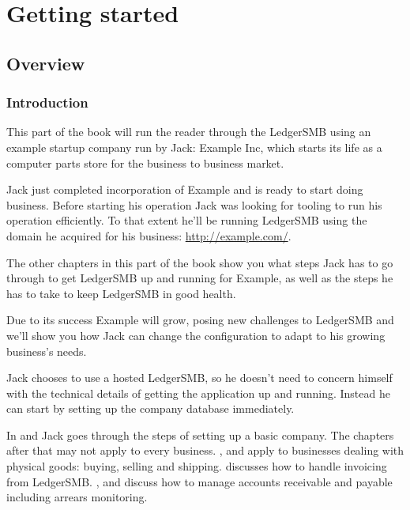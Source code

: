 

\part{Getting started}
\label{part-getting-started}

\chapter{Overview}
\label{cha-starting-overviev}

\section{Introduction}
\label{sec-starting-introduction}

This part of the book will run the reader through the LedgerSMB using an example
startup company run by Jack: Example Inc, which starts its life as a computer parts
store for the business to business market.

Jack just completed incorporation of Example and is ready to start doing business.
Before starting his operation Jack was looking for tooling to run his operation
efficiently. To that extent he'll be running LedgerSMB using the domain he acquired
for his business: \url{http://example.com/}.

The other chapters in this part of the book show you what steps Jack has to go through
to get LedgerSMB up and running for Example, as well as the steps he has to take to
keep LedgerSMB in good health.

Due to its success Example will grow, posing new challenges to LedgerSMB and we'll show
you how Jack can change the configuration to adapt to his growing business's needs.

Jack chooses to use a hosted LedgerSMB, so he doesn't need to concern himself with the
technical details of getting the application up and running. Instead he can start by setting
up the company database immediately.

In  and  Jack goes through the
steps of setting up a basic company. The chapters after that may not apply to every
business. ,  and
 apply to businesses dealing with physical goods: buying,
selling and shipping.  discusses how to handle invoicing from LedgerSMB.
,  and 
discuss how to manage accounts receivable and payable including arrears monitoring.

